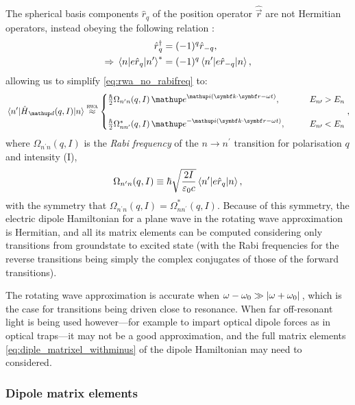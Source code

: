 The spherical basis components $\hat r_q$ of the position operator $\hat{\vec r}$ are not Hermitian operators, instead obeying the following relation \cite{steck_quantum_2017}:
\begin{align}
\hat r_q^\dagger &= (-1)^q \hat r_{-q},\\
\Rightarrow \matrixel{n} {e\hat r_q}{n^\prime}^* &= (-1)^q\matrixel{n^\prime} {e\hat r_{-q}}{n},
\end{align}
allowing us to simplify \eqref{eq:rwa_no_rabifreq} to:
\begin{align}\label{eq:rwa_with_rabifreq}
\matrixel{n^\prime}{\hat H_\up{d}(q,I)}{n} \overset{\textsc{rwa}}\approx
\begin{cases}
\frac\hbar2\Omega_{n^\prime n}(q, I)\,
\ee^{\ii(\vec k \cdot \vec r - \omega t)},\qquad &E_{n\prime} > E_n\\
\\
\frac\hbar2\Omega^*_{n n^\prime}(q, I)\,
\ee^{-\ii(\vec k \cdot \vec r - \omega t)},\qquad &E_{n\prime} < E_n
\end{cases},
\end{align}
where $\Omega_{n^\prime n}(q, I)$ is the \emph{Rabi frequency} of the $n\rightarrow n^\prime$ transition for polarisation $q$ and intensity (I),
\begin{align}
\Omega_{n^\prime n}(q, I) \equiv \hbar\sqrt{\frac{2I}{\varepsilon_0 c}}
\matrixel{n^\prime}{e\hat r_q}{n},
\end{align}
with the symmetry that $\Omega_{n^\prime n}(q, I) = \Omega^*_{n n^\prime}(q, I)$. Because of this symmetry, the electric dipole Hamiltonian for a plane wave in the rotating wave approximation is Hermitian, and all its matrix elements can be computed considering only transitions from groundstate to excited state (with the Rabi frequencies for the reverse transitions being simply the complex conjugates of those of the forward transitions).

The rotating wave approximation is accurate when $\omega - \omega_0 \gg \abs{\omega + \omega_0}$, which is the case for transitions being driven close to resonance. When far off-resonant light is being used however---for example to impart optical dipole forces as in optical traps---it may not be a good approximation, and the full matrix elements \eqref{eq:diple_matrixel_withminus} of the dipole Hamiltonian may need to considered.

\subsubsection{Dipole matrix elements}

